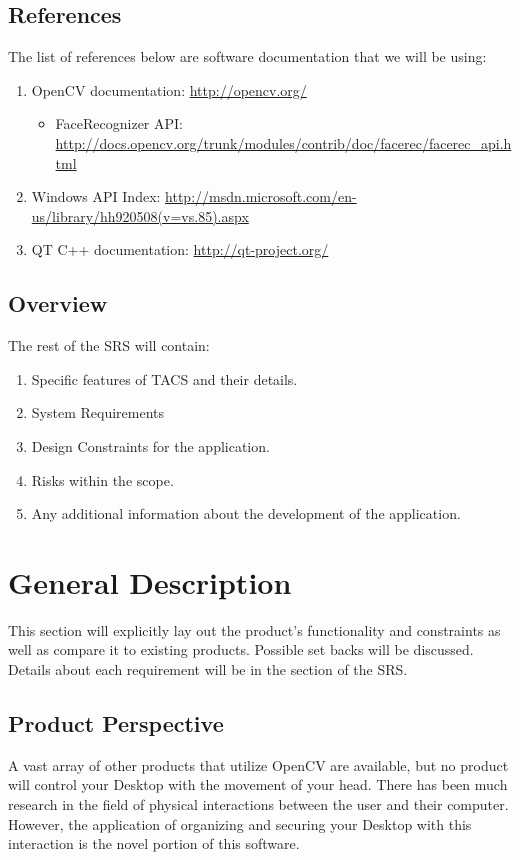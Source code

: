 \documentclass[titlepage]{article}
\begin{document}
\subsection{References}
The list of references below are software documentation that we will be using:
\begin{enumerate}
	\item OpenCV documentation: \href{http://opencv.org/}{\color{blue} http://opencv.org/}
	\begin{itemize}
		\item FaceRecognizer API: \href{http://docs.opencv.org/trunk/modules/contrib/doc/facerec/facerec\_api.html}{\color{blue} http://docs.opencv.org/trunk/modules/contrib/doc/facerec/facerec\_api.html}
	\end{itemize}
	\item Windows API Index: \href{http://msdn.microsoft.com/en-us/library/hh920508(v=vs.85).aspx}{\color{blue} http://msdn.microsoft.com/en-us/library/hh920508(v=vs.85).aspx}
	\item QT C++ documentation: \href{http://qt-project.org/}{\color{blue} http://qt-project.org/}
\end{enumerate}

\subsection{Overview}
The rest of the SRS will contain:
\begin{enumerate}
	\item Specific features of TACS and their details.
	\item System Requirements
	\item Design Constraints for the application.
	\item Risks within the scope.
	\item Any additional information about the development of the application.
\end{enumerate}

\section{General Description}
This section will explicitly lay out the product's functionality and constraints as well as compare it to existing products. Possible set backs will be discussed. Details about each requirement will be in the  section of the SRS. 

\subsection{Product Perspective}
A vast array of other products that utilize OpenCV are available, but no product will control your Desktop with the movement of your head. There has been much research in the field of physical interactions between the user and their computer. However, the application of organizing and securing your Desktop with this interaction is the novel portion of this software.
\end{document}
